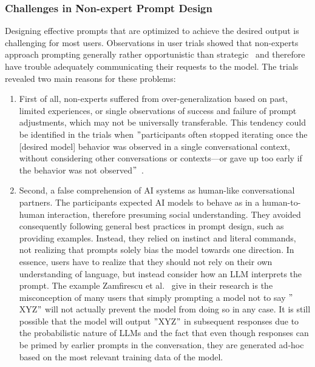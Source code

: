 \subsubsection{Challenges in Non-expert Prompt Design}
Designing effective prompts that are optimized to achieve the desired output is challenging for
most users.
Observations in user trials showed that non-experts approach prompting generally rather
opportunistic than strategic~\cite{zamfirescu-pereira_why_2023} and therefore have trouble
adequately communicating their requests to the model.
The trials revealed two main reasons for these problems:
\begin{enumerate}
    \item First of all, non-experts suffered from over-generalization based on past, limited experiences,
    or single observations of success and failure of prompt adjustments, which may not be universally
    transferable. %
    This tendency could be identified in the trials when \("\)participants often stopped iterating
    once the [desired model] behavior was observed in a single conversational context,
    without considering other conversations or contexts—or gave up too early
    if the behavior was not observed\("\)~\cite[p. 10]{zamfirescu-pereira_why_2023}.
    \item Second, a false comprehension of AI systems as human-like conversational partners.
    The participants expected AI models to behave as in a human-to-human interaction,
    therefore presuming social understanding.
    They avoided consequently following general best practices in prompt design, such as providing
    examples.
    Instead, they relied on instinct and literal commands, not realizing that prompts
    solely bias the model towards one direction.
    In essence, users have to realize that they should not rely on their own understanding of
    language, but instead consider how an LLM interprets the prompt.
    The example Zamfirescu et al\(.\)~\cite{zamfirescu-pereira_why_2023} give in their research
    is the misconception of many
    users
    that simply prompting a model not to say \("\)XYZ\("\) will not actually prevent the model from doing
    so in any case.
    It is still possible that the model will output \("\)XYZ\("\) in subsequent responses due to
    the probabilistic nature of LLMs and the fact that even though responses can be primed
    by earlier prompts in the conversation, they are generated ad-hoc based on the most relevant
    training data of the model.
\end{enumerate}

